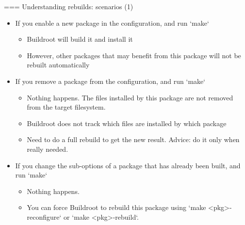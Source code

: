 === {Understanding rebuilds: scenarios (1)}
  \begin{itemize}
  \item If you enable a new package in the configuration, and run
    `make`
    \begin{itemize}
    \item Buildroot will build it and install it
    \item However, other packages that may benefit from this package
      will not be rebuilt automatically
    \end{itemize}
  \item If you remove a package from the configuration, and run
    `make`
    \begin{itemize}
    \item Nothing happens. The files installed by this package are not
      removed from the target filesystem.
    \item Buildroot does not track which files are installed by which
      package
    \item Need to do a full rebuild to get the new result. Advice: do
      it only when really needed.
    \end{itemize}
  \item If you change the sub-options of a package that has already
    been built, and run `make`
    \begin{itemize}
    \item Nothing happens.
    \item You can force Buildroot to rebuild this package using
      `make <pkg>-reconfigure` or `make <pkg>-rebuild`.
    \end{itemize}
  \end{itemize}


